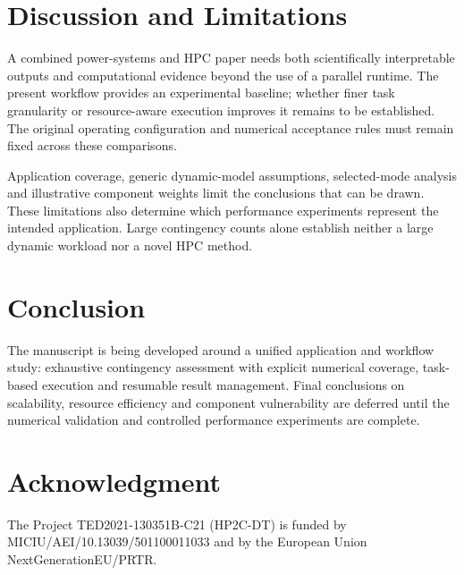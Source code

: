 \documentclass[journal]{IEEEtran}
\begin{document}
\section{Discussion and Limitations}
A combined power-systems and HPC paper needs both scientifically interpretable outputs and computational evidence beyond the use of a parallel runtime. The present workflow provides an experimental baseline; whether finer task granularity or resource-aware execution improves it remains to be established. The original operating configuration and numerical acceptance rules must remain fixed across these comparisons.

Application coverage, generic dynamic-model assumptions, selected-mode analysis and illustrative component weights limit the conclusions that can be drawn. These limitations also determine which performance experiments represent the intended application. Large contingency counts alone establish neither a large dynamic workload nor a novel HPC method.

\section{Conclusion}
\label{conclusion}
The manuscript is being developed around a unified application and workflow study: exhaustive contingency assessment with explicit numerical coverage, task-based execution and resumable result management. Final conclusions on scalability, resource efficiency and component vulnerability are deferred until the numerical validation and controlled performance experiments are complete.

\section*{Acknowledgment}
\label{acknowledgement}

The Project TED2021-130351B-C21 (HP2C-DT) is funded by MICIU/AEI/10.13039/501100011033 and by the European Union NextGenerationEU/PRTR.
\end{document}
